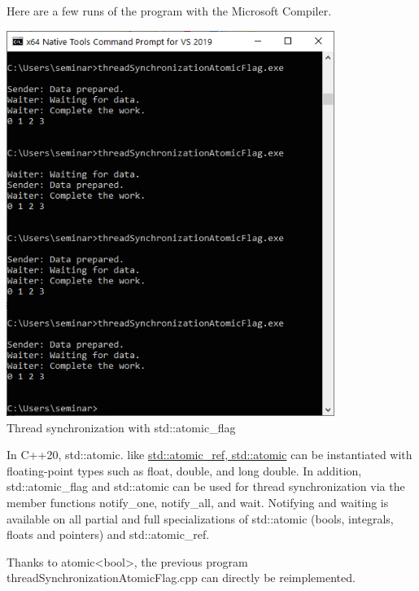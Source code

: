 Here are a few runs of the program with the Microsoft Compiler.

\begin{center}
\includegraphics[width=0.8\textwidth]{content/3/chapter6/images/13.png}\\
Thread synchronization with std::atomic\_flag
\end{center}


In C++20, std::atomic. like \href{https://en.cppreference.com/w/cpp/atomic/atomic}{std::atomic\_ref, std::atomic} can be instantiated with floating-point types such as float, double, and long double. In addition, std::atomic\_flag and std::atomic can be used for thread synchronization via the member functions notify\_one, notify\_all, and wait. Notifying and waiting is available on all partial and full specializations of std::atomic (bools, integrals, floats and pointers) and std::atomic\_ref.

Thanks to atomic<bool>, the previous program threadSynchronizationAtomicFlag.cpp can directly be reimplemented.

